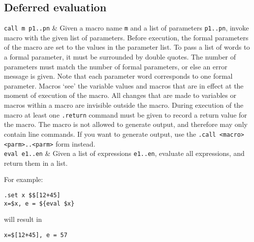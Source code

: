\subsection{Deferred evaluation}
\begin{desctab}
{\tt call m p1..pn}
&
Given a macro name \verb+m+ and a list of parameters \verb+p1..pn+,
invoke macro with the given list of parameters.
Before execution,
the formal parameters of the macro are set to the values in the parameter list.
To pass a list of words to a formal parameter,
it must be surrounded by double quotes.
The number of parameters must match the number of formal parameters,
or else an error message is given.
Note that each parameter word corresponds to one formal parameter.
Macros `see' the variable values and macros that are in effect at the moment
of execution of the macro.
All changes that are made to variables or macros within a macro
are invisible outside the macro.
During execution of the macro at least one \verb+.return+ command must be
given to record a return value for the macro.
The macro is not allowed to generate output, and therefore may only contain
line commands.
If you want to generate output, 
use the \verb+.call <macro> <parm>..<parm>+ form instead.
\\
{\tt eval e1..en}
&
Given a list of expressions \verb+e1..en+, evaluate all expressions,
and return them in a list.
\\
\end{desctab}
For example:
\begin{verbatim}
.set x $$[12+45]
x=$x, e = ${eval $x}
\end{verbatim}
will result in
\begin{verbatim}
x=$[12+45], e = 57
\end{verbatim}
